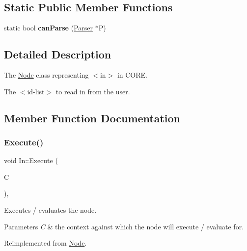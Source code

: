 \subsection*{Static Public Member Functions}
\begin{DoxyCompactItemize}
\item 
\mbox{\label{class_in_a9d7d32296bf9afcb8418a905f8c18521}} 
static bool {\bfseries can\+Parse} (\mbox{\hyperlink{class_parser}{Parser}} $\ast$P)
\end{DoxyCompactItemize}


\subsection{Detailed Description}
The \mbox{\hyperlink{class_node}{Node}} class representing {\ttfamily $<$in$>$} in C\+O\+RE. 

The $<$id-\/list$>$ to read in from the user. 

\subsection{Member Function Documentation}
\mbox{\label{class_in_afb7785ea5139aea43adad662a1efc4c9}} 
\subsubsection{\texorpdfstring{Execute()}{Execute()}}
{\footnotesize\ttfamily void In\+::\+Execute (\begin{DoxyParamCaption}\item[{\mbox{\hyperlink{class_a_s_t_context}{A\+S\+T\+Context}} \&}]{C }\end{DoxyParamCaption})\hspace{0.3cm}{\ttfamily [override]}, {\ttfamily [virtual]}}

Executes / evaluates the node. 
\begin{DoxyParams}{Parameters}
{\em C} & the context against which the node will execute / evaluate for. \\
\hline
\end{DoxyParams}


Reimplemented from \mbox{\hyperlink{class_node_a27ad1ba81d2596817b361368282bcbfa}{Node}}.

\mbox{\label{class_in_a309553a9aa17740ec97c110d8697e0a6}} 
